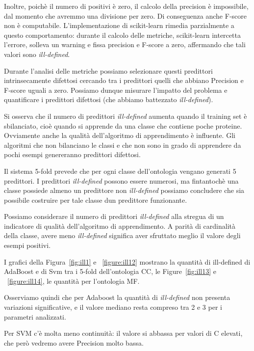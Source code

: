 \documentclass[12pt,a4paper,oneside,hidelinks]{report}
\begin{document}
Inoltre, poichè il numero di positivi è zero, il calcolo della precision è impossibile, dal momento che avremmo una divisione per zero. Di conseguenza anche F-score non è computabile. L'implementazione di scikit-learn rimedia parzialmente a questo comportamento: durante il calcolo delle metriche, scikit-learn intercetta l'errore, solleva un warning e fissa precision e F-score a zero, affermando che tali valori sono \emph{ill-defined}.

Durante l'analisi delle metriche possiamo selezionare questi predittori intrinsecamente difettosi cercando tra i predittori quelli che abbiano Precision e F-score uguali a zero. Possiamo dunque misurare l'impatto del problema e quantificare i predittori difettosi (che abbiamo battezzato  \emph{ill-defined}).

Si osserva che il numero di predittori \emph{ill-defined} aumenta quando il training set è sbilanciato, cioè quando si apprende da una classe che contiene poche proteine. Ovviamente anche la qualità dell'algoritmo di apprendimento è influente. Gli algoritmi che non bilanciano le classi e che non sono in grado di apprendere da pochi esempi genereranno predittori difettosi.

Il sistema 5-fold prevede che per ogni classe dell'ontologia vengano generati 5 predittori. I predittori \emph{ill-defined} possono essere numerosi, ma fintantochè una classe possiede almeno un predittore non \emph{ill-defined} possiamo concludere che sia possibile costruire per tale classe dun predittore funzionante.

Possiamo considerare il numero di predittori \emph{ill-defined} alla stregua di un indicatore di qualità dell'algoritmo di apprendimento. A parità di cardinalità della classe, avere meno \emph{ill-defined} significa aver sfruttato meglio il valore degli esempi positivi.

I grafici della Figura~\ref{fig:ill1} e ~\ref{figure:ill12} mostrano la quantità di ill-defined di AdaBoost e di Svm tra i 5-fold dell'ontologia CC, le Figure~\ref{fig:ill13} e ~\ref{figure:ill14}, le quantità per l'ontologia MF.

Osserviamo quindi che per Adaboost la quantità di \emph{ill-defined} non presenta variazioni significative, e il valore mediano resta compreso tra 2 e 3 per i parametri analizzati.

Per SVM c'è molta meno continuità: il valore si abbassa per valori di C elevati, che però vedremo avere Precision molto bassa.
\end{document}
